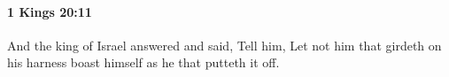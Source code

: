 
		\paragraph{1 Kings 20:11} %
			\label{1KINGS-20-11}

			And the king of Israel answered and said, Tell him, Let not him that girdeth on his harness boast himself as he that putteth it off.


